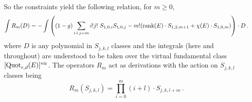 \documentclass[11pt]{amsart}
\theoremstyle{remark}
\newcommand{\K}{\mathcal{K}}
\newcommand{\rk}{\textnormal{rank}}
\newcommand{\quot}[0]{\textnormal{Quot}}
\newcommand{\vir}[0]{\textnormal{vir}}
\numberwithin{theorem}{section}
\begin{document}
So the constraints yield the following relation, for $m \geq 0$,
\begin{equation}\label{equation virasoro relations}
    \int R_m(D) = - \int \left( (1-g) \sum_{i+j=m}i!j!\ S_{1,0,i}S_{1,0,j} - m!(\rk(E) \cdot S_{1,2,m+1} + \chi(E) \cdot S_{1,0,m}) \right) \cdot D\,.
\end{equation}
where $D$ is any polynomial in $S_{j,k,l}$ classes and
the integrals (here and throughout) are understood to be taken over the virtual fundamental class $[\quot_{r,d}(E)]^\vir$.
The operators $R_m$ act as derivations with the action on $S_{j,k,l}$ classes being 
$$R_m(S_{j,k,l})= \prod_{i=0}^m (i+l) \cdot S_{j,k,l+m}\,.$$
\end{document}

